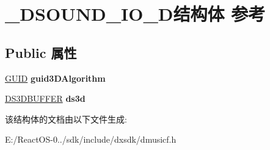 \hypertarget{struct___d_s_o_u_n_d___i_o__3_d}{}\section{\+\_\+\+D\+S\+O\+U\+N\+D\+\_\+\+I\+O\+\_\+D结构体 参考}
\label{struct___d_s_o_u_n_d___i_o__3_d}
\subsection*{Public 属性}
\begin{DoxyCompactItemize}
\item 
\mbox{\label{struct___d_s_o_u_n_d___i_o__3_d_aff26ae6199fe0b350d5195b70ebe3a3f}} 
\hyperlink{interface_g_u_i_d}{G\+U\+ID} {\bfseries guid3\+D\+Algorithm}
\item 
\mbox{\label{struct___d_s_o_u_n_d___i_o__3_d_a75f97d629210606af5d20faf59c9c572}} 
\hyperlink{struct___d_s3_d_b_u_f_f_e_r}{D\+S3\+D\+B\+U\+F\+F\+ER} {\bfseries ds3d}
\end{DoxyCompactItemize}


该结构体的文档由以下文件生成\+:\begin{DoxyCompactItemize}
\item 
E\+:/\+React\+O\+S-\/0../sdk/include/dxsdk/dmusicf.\+h\end{DoxyCompactItemize}
